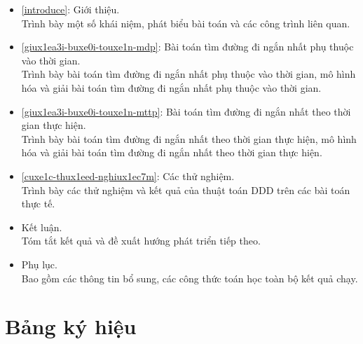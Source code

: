 \documentclass[fontsize=14pt,DIV=15pt,twoside=false]{scrbook}
\begin{document}
\begin{itemize}
    \item \autoref{introduce}: Giới thiệu.\\
        Trình bày một số khái niệm, phát biểu bài toán và các công trình liên quan.
    \item \autoref{giux1ea3i-buxe0i-touxe1n-mdp}: Bài toán tìm đường đi ngắn nhất phụ thuộc vào thời gian.\\
        Trình bày bài toán tìm đường đi ngắn nhất phụ thuộc vào thời gian, mô hình hóa và giải bài toán tìm đường đi ngắn nhất phụ thuộc vào thời gian.
    
    \item \autoref{giux1ea3i-buxe0i-touxe1n-mttp}: Bài toán tìm đường đi ngắn nhất theo thời gian thực hiện.\\
        Trình bày bài toán tìm đường đi ngắn nhất theo thời gian thực hiện, mô hình hóa và giải bài toán tìm đường đi ngắn nhất theo thời gian thực hiện.
    
    \item \autoref{cuxe1c-thux1eed-nghiux1ec7m}: Các thử nghiệm.\\
        Trình bày các thử nghiệm và kết quả của thuật toán DDD trên các bài toán thực tế.
    
    \item Kết luận.\\
        Tóm tắt kết quả và đề xuất hướng phát triển tiếp theo.
    \item Phụ lục.\\
        Bao gồm các thông tin bổ sung, các công thức toán học toàn bộ kết quả chạy.
\end{itemize}

\chapter*{Bảng ký hiệu}\label{bang-ky-hieu}

\end{document}

